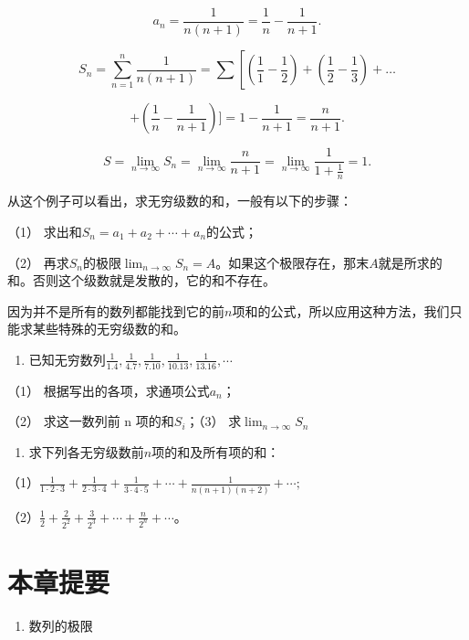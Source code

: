 \[
a_{n} = \frac{1}{n (n + 1)} = \frac{1}{n} - \frac{1}{n + 1}.
\]

\[
S_{n} = \sum_{n = 1}^{n} \frac{1}{n (n + 1)} = \sum \left[ \left(\frac{1}{1} - \frac{1}{2}\right) + \left(\frac{1}{2} - \frac{1}{3}\right) + \dots \right.
\]

\[
+ \left(\frac{1}{n} - \frac{1}{n + 1}\right) ] = 1 - \frac{1}{n + 1} = \frac{n}{n + 1}.
\]

\[
S=\lim_{n\rightarrow\infty}S_n = \lim_{n \rightarrow \infty} \frac{n}{n + 1} = \lim_{n \rightarrow \infty} \frac{1}{1 + \frac{1}{n}} = 1.
\]

从这个例子可以看出，求无穷级数的和，一般有以下的步骤：

（1） 求出和\(S_{n}=a_{1}+a_{2}+\cdots+a_{n}\)的公式；

（2）
再求\(S_{n}\)的极限\(\lim_{n\to \infty}S_n = A\)。如果这个极限存在，那末\(A\)就是所求的和。否则这个级数就是发散的，它的和不存在。

因为并不是所有的数列都能找到它的前\(n\)项和的公式，所以应用这种方法，我们只能求某些特殊的无穷级数的和。

\begin{enumerate}
\item
  已知无穷数列\(\frac{1}{1.4}, \frac{1}{4.7}, \frac{1}{7.10}, \frac{1}{10.13}, \frac{1}{13.16}, \cdots\)
\end{enumerate}

（1） 根据写出的各项，求通项公式\(a_{n}\)；

（2） 求这一数列前 n 项的和\(S_{i}\)；（3） 求\(\lim_{n\to\infty}S_{n}\)

\begin{enumerate}[start=2]
\item
  求下列各无穷级数前\(n\)项的和及所有项的和：
\end{enumerate}

（1）\(\frac{1}{1 \cdot 2 \cdot 3} + \frac{1}{2 \cdot 3 \cdot 4} + \frac{1}{3 \cdot 4 \cdot 5} + \cdots + \frac{1}{n(n+1)(n+2)} + \cdots;\)

（2）\(\frac{1}{2} + \frac{2}{2^2} + \frac{3}{2^3} + \cdots + \frac{n}{2^n} + \cdots\)。

\section{本章提要}

\begin{enumerate}
\item
  数列的极限
\end{enumerate}


